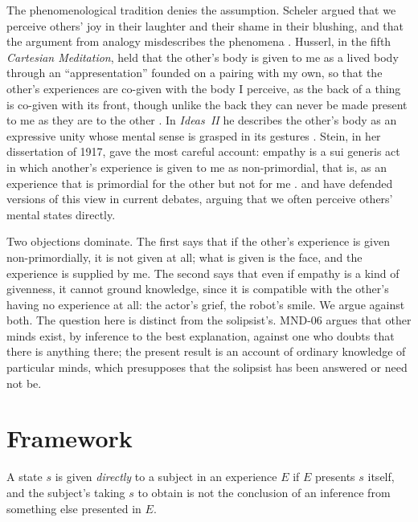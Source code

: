 \documentclass{situationist-preprint}
\begin{document}
The phenomenological tradition denies the assumption. Scheler argued that we perceive others' joy in their laughter and their shame in their blushing, and that the argument from analogy misdescribes the phenomena \citep{Scheler1923}. Husserl, in the fifth \emph{Cartesian Meditation}, held that the other's body is given to me as a lived body through an \enquote{appresentation} founded on a pairing with my own, so that the other's experiences are co-given with the body I perceive, as the back of a thing is co-given with its front, though unlike the back they can never be made present to me as they are to the other \citep[\S\S50--54]{Husserl1950}. In \emph{Ideas~II} he describes the other's body as an expressive unity whose mental sense is grasped in its gestures \citep[\S\S43--47]{Husserl1952}. Stein, in her dissertation of 1917, gave the most careful account: empathy is a sui generis act in which another's experience is given to me as non-primordial, that is, as an experience that is primordial for the other but not for me \citep{Stein1917}. \citet{Zahavi2014} and \citet{Gallagher2008} have defended versions of this view in current debates, arguing that we often perceive others' mental states directly.

Two objections dominate. The first says that if the other's experience is given non-primordially, it is not given at all; what is given is the face, and the experience is supplied by me. The second says that even if empathy is a kind of givenness, it cannot ground knowledge, since it is compatible with the other's having no experience at all: the actor's grief, the robot's smile. We argue against both. The question here is distinct from the solipsist's. MND-06 argues that other minds exist, by inference to the best explanation, against one who doubts that there is anything there; the present result is an account of ordinary knowledge of particular minds, which presupposes that the solipsist has been answered or need not be.

\section{Framework}

\begin{definition}\label{d:direct}
A state $s$ is given \emph{directly} to a subject in an experience $E$ if $E$ presents $s$ itself, and the subject's taking $s$ to obtain is not the conclusion of an inference from something else presented in $E$.
\end{definition}
\end{document}
